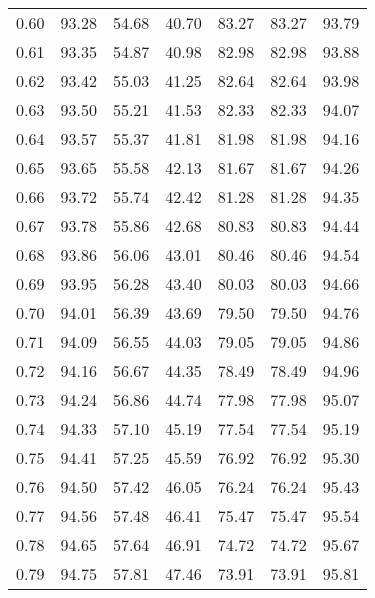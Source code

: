 \begin{tabular}{|c|c|c|c|c|c|c|}
      0.60 &     93.28 &     54.68 &      40.70 &   83.27 &      83.27 &         93.79 \\
      0.61 &     93.35 &     54.87 &      40.98 &   82.98 &      82.98 &         93.88 \\
      0.62 &     93.42 &     55.03 &      41.25 &   82.64 &      82.64 &         93.98 \\
      0.63 &     93.50 &     55.21 &      41.53 &   82.33 &      82.33 &         94.07 \\
      0.64 &     93.57 &     55.37 &      41.81 &   81.98 &      81.98 &         94.16 \\
      0.65 &     93.65 &     55.58 &      42.13 &   81.67 &      81.67 &         94.26 \\
      0.66 &     93.72 &     55.74 &      42.42 &   81.28 &      81.28 &         94.35 \\
      0.67 &     93.78 &     55.86 &      42.68 &   80.83 &      80.83 &         94.44 \\
      0.68 &     93.86 &     56.06 &      43.01 &   80.46 &      80.46 &         94.54 \\
      0.69 &     93.95 &     56.28 &      43.40 &   80.03 &      80.03 &         94.66 \\
      0.70 &     94.01 &     56.39 &      43.69 &   79.50 &      79.50 &         94.76 \\
      0.71 &     94.09 &     56.55 &      44.03 &   79.05 &      79.05 &         94.86 \\
      0.72 &     94.16 &     56.67 &      44.35 &   78.49 &      78.49 &         94.96 \\
      0.73 &     94.24 &     56.86 &      44.74 &   77.98 &      77.98 &         95.07 \\
      0.74 &     94.33 &     57.10 &      45.19 &   77.54 &      77.54 &         95.19 \\
      0.75 &     94.41 &     57.25 &      45.59 &   76.92 &      76.92 &         95.30 \\
      0.76 &     94.50 &     57.42 &      46.05 &   76.24 &      76.24 &         95.43 \\
      0.77 &     94.56 &     57.48 &      46.41 &   75.47 &      75.47 &         95.54 \\
      0.78 &     94.65 &     57.64 &      46.91 &   74.72 &      74.72 &         95.67 \\
      0.79 &     94.75 &     57.81 &      47.46 &   73.91 &      73.91 &         95.81 \\

\end{tabular}
